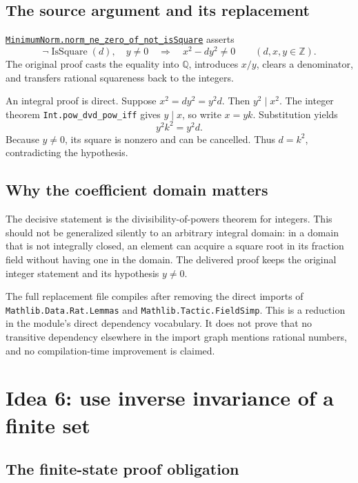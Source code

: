 \documentclass[11pt,letterpaper]{article}
\newcommand{\code}[1]{\nolinkurl{#1}}
\newcommand{\repo}[2]{\href{https://github.com/VladimirReshetnikov/ProveIt/blob/b310142330df89e48413c8fce62e7de223e1c7d5/#1}{#2}}
\newcommand{\modulelink}[2]{\repo{Computability/DiophantineConsistency/Lean/DiophantineConsistency/#1.lean}{#2}}
\begin{document}
\subsection{The source argument and its replacement}

\modulelink{MinimumNorm}{\code{MinimumNorm.norm_ne_zero_of_not_isSquare}}
asserts
\[
 \neg\operatorname{IsSquare}(d),\quad y\ne0
 \quad\Longrightarrow\quad x^2-dy^2\ne0
 \qquad(d,x,y\in\mathbb Z).
\]
The original proof casts the equality into $\mathbb Q$, introduces $x/y$,
clears a denominator, and transfers rational squareness back to the integers.

An integral proof is direct. Suppose $x^2=dy^2=y^2d$. Then $y^2\mid x^2$.
The integer theorem \code{Int.pow_dvd_pow_iff} gives $y\mid x$, so write
$x=yk$. Substitution yields
\[
 y^2k^2=y^2d.
\]
Because $y\ne0$, its square is nonzero and can be cancelled. Thus $d=k^2$,
contradicting the hypothesis.


\subsection{Why the coefficient domain matters}

The decisive statement is the divisibility-of-powers theorem for integers.
This should not be generalized silently to an arbitrary integral domain:
in a domain that is not integrally closed, an element can acquire a square
root in its fraction field without having one in the domain. The delivered
proof keeps the original integer statement and its hypothesis $y\ne0$.

The full replacement file compiles after removing the direct imports of
\code{Mathlib.Data.Rat.Lemmas} and \code{Mathlib.Tactic.FieldSimp}. This is a
reduction in the module's direct dependency vocabulary. It does not prove that
no transitive dependency elsewhere in the import graph mentions rational
numbers, and no compilation-time improvement is claimed.

\section{Idea 6: use inverse invariance of a finite set}

\subsection{The finite-state proof obligation}
\end{document}
